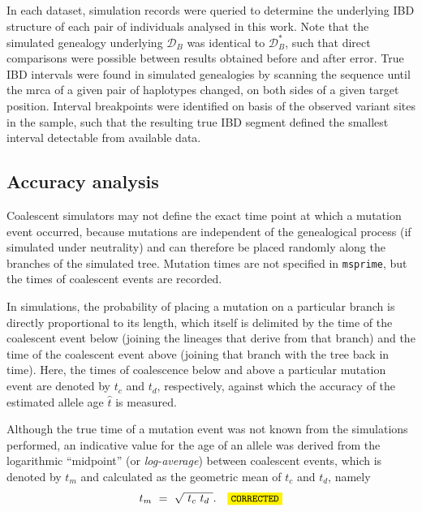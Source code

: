 In each dataset, simulation records were queried to determine the underlying IBD structure of each pair of individuals analysed in this work.
Note that the simulated genealogy underlying $\mathcal{D}_B$ was identical to $\mathcal{D}_B^{\ast}$, such that direct comparisons were possible between results obtained before and after error.
True IBD intervals were found in simulated genealogies by scanning the sequence until the \gls{mrca} of a given pair of haplotypes changed, on both sides of a given target position.
Interval breakpoints were identified on basis of the observed variant sites in the sample, such that the resulting true IBD segment defined the smallest interval detectable from available data.




%
\subsection{Accuracy analysis}
%

Coalescent simulators may not define the exact time point at which a mutation event occurred, because mutations are independent of the genealogical process (if simulated under neutrality) and can therefore be placed randomly along the branches of the simulated tree.
Mutation times are not specified in \texttt{msprime}, but the times of coalescent events are recorded.

In simulations, the probability of placing a mutation on a particular branch is directly proportional to its length, which itself is delimited by the time of the coalescent event below (joining the lineages that derive from that branch) and the time of the coalescent event above (joining that branch with the tree back in time).
Here, the times of coalescence below and above a particular mutation event are denoted by $t_c$ and $t_d$, respectively, against which the accuracy of the estimated allele age $\hat{t}$ is measured.

Although the true time of a mutation event was not known from the simulations performed, an indicative value for the age of an allele was derived from the logarithmic ``midpoint'' (or \emph{log-average}) between coalescent events, which is denoted by $t_m$ and calculated as the geometric mean of $t_c$ and $t_d$, namely
\begin{equation}
	t_m~=~\sqrt{~t_c ~ t_d~}\text{.}\CorrectLabel
\end{equation}

